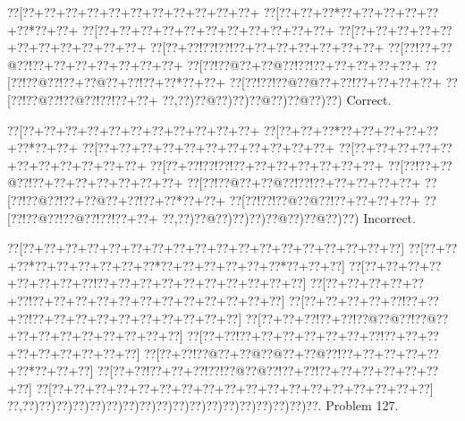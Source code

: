 \documentclass[a5paper]{article}
\begin{document}
\begin{center}
{\goo
\0??[\0??+\0??+\0??+\0??+\0??+\0??+\0??+\0??+\0??+\0??+\0??+
\0??[\0??+\0??+\0??*\0??+\0??+\0??+\0??+\0??+\0??*\0??+\0??+
\0??[\0??+\0??+\0??+\0??+\0??+\0??+\0??+\0??+\0??+\0??+\0??+
\0??[\0??+\0??+\0??+\0??+\0??+\0??+\0??+\0??+\0??+\0??+\0??+
\0??[\0??+\0??!\0??!\0??!\0??+\0??+\0??+\0??+\0??+\0??+\0??+
\0??[\0??!\0??+\0??@\0??!\0??+\0??+\0??+\0??+\0??+\0??+\0??+
\0??[\0??!\0??@\0??+\0??@\0??!\0??!\0??+\0??+\0??+\0??+\0??+
\0??[\0??!\0??@\0??!\0??+\0??@\0??+\0??!\0??+\0??*\0??+\0??+
\0??[\0??!\0??!\0??@\0??@\0??+\0??!\0??+\0??+\0??+\0??+
\0??[\0??!\0??@\0??!\0??@\0??!\0??!\0??+\0??+
\0??,\0??)\0??@\0??)\0??)\0??@\0??)\0??@\0??)\0??)
}
Correct. 

\end{center}
\begin{center}
{\goo
\0??[\0??+\0??+\0??+\0??+\0??+\0??+\0??+\0??+\0??+\0??+\0??+
\0??[\0??+\0??+\0??*\0??+\0??+\0??+\0??+\0??+\0??*\0??+\0??+
\0??[\0??+\0??+\0??+\0??+\0??+\0??+\0??+\0??+\0??+\0??+\0??+
\0??[\0??+\0??+\0??+\0??+\0??+\0??+\0??+\0??+\0??+\0??+\0??+
\0??[\0??+\0??!\0??!\0??!\0??+\0??+\0??+\0??+\0??+\0??+\0??+
\0??[\0??!\0??+\0??@\0??!\0??+\0??+\0??+\0??+\0??+\0??+\0??+
\0??[\0??!\0??@\0??+\0??@\0??!\0??!\0??+\0??+\0??+\0??+\0??+
\0??[\0??!\0??@\0??!\0??+\0??@\0??+\0??!\0??+\0??*\0??+\0??+
\0??[\0??!\0??!\0??@\0??@\0??!\0??+\0??+\0??+\0??+
\0??[\0??!\0??@\0??!\0??@\0??!\0??!\0??+\0??+
\0??,\0??)\0??@\0??)\0??)\0??)\0??@\0??)\0??@\0??)\0??)
}
Incorrect. 

\end{center}
\newpage
\begin{center}
{\goo
\0??[\0??+\0??+\0??+\0??+\0??+\0??+\0??+\0??+\0??+\0??+\0??+\0??+\0??+\0??+\0??+\0??+\0??+\0??]
\0??[\0??+\0??+\0??*\0??+\0??+\0??+\0??+\0??+\0??*\0??+\0??+\0??+\0??+\0??+\0??*\0??+\0??+\0??]
\0??[\0??+\0??+\0??+\0??+\0??+\0??+\0??+\0??!\0??+\0??+\0??+\0??+\0??+\0??+\0??+\0??+\0??+\0??]
\0??[\0??+\0??+\0??+\0??+\0??+\0??!\0??+\0??+\0??+\0??+\0??+\0??+\0??+\0??+\0??+\0??+\0??+\0??]
\0??[\0??+\0??+\0??+\0??+\0??!\0??+\0??+\0??!\0??+\0??+\0??+\0??+\0??+\0??+\0??+\0??+\0??+\0??]
\0??[\0??+\0??+\0??!\0??+\0??!\0??@\0??@\0??!\0??@\0??+\0??+\0??+\0??+\0??+\0??+\0??+\0??+\0??]
\0??[\0??+\0??!\0??+\0??+\0??+\0??+\0??+\0??+\0??!\0??+\0??+\0??+\0??+\0??+\0??+\0??+\0??+\0??]
\0??[\0??+\0??!\0??@\0??+\0??@\0??@\0??+\0??@\0??!\0??+\0??+\0??+\0??+\0??+\0??*\0??+\0??+\0??]
\0??[\0??+\0??!\0??+\0??+\0??!\0??!\0??@\0??@\0??!\0??+\0??!\0??+\0??+\0??+\0??+\0??+\0??+\0??]
\0??[\0??+\0??+\0??+\0??+\0??+\0??+\0??+\0??+\0??+\0??+\0??+\0??+\0??+\0??+\0??+\0??+\0??+\0??]
\0??,\0??)\0??)\0??)\0??)\0??)\0??)\0??)\0??)\0??)\0??)\0??)\0??)\0??)\0??)\0??)\0??)\0??)\0??.
}
Problem 127.

\end{center}
\end{document}
